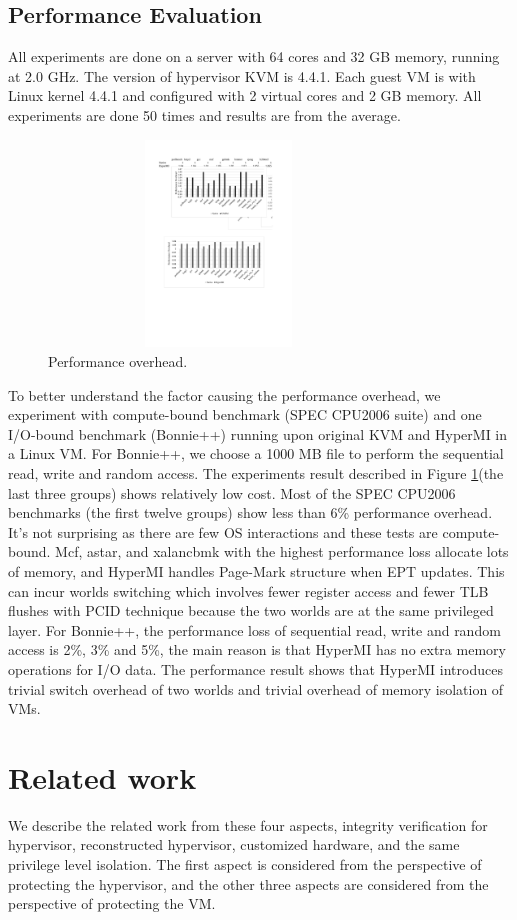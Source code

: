 \documentclass[conference]{IEEEtran}
\begin{document}
\subsection{Performance Evaluation}
All experiments are done on a server with 64 cores and 32 GB memory, running at 2.0 GHz. The version of hypervisor KVM is 4.4.1. Each guest VM is with Linux kernel 4.4.1 and configured with 2 virtual cores and 2 GB memory. All experiments are done 50 times and results are from the average.
\begin{figure}
\centerline{\includegraphics[width=9cm,height=5.5cm]{performance.pdf}}
\caption{Performance overhead.} \label{fig5}
\end{figure}
To better understand the factor causing the performance overhead, we experiment with compute-bound benchmark (SPEC CPU2006 suite) and one I/O-bound benchmark (Bonnie++) running upon original KVM and HyperMI in a Linux VM. For Bonnie++, we choose a 1000 MB file to perform the sequential read, write and random access. The experiments result described in Figure \ref{fig5}(the last three groups) shows relatively low cost. Most of the SPEC CPU2006 benchmarks (the first twelve groups) show less than 6\% performance overhead. It's not surprising as there are few OS interactions and these tests are compute-bound. Mcf, astar, and xalancbmk with the highest performance loss allocate lots of memory, and HyperMI handles Page-Mark structure when EPT updates. This can incur worlds switching which involves fewer register access and fewer TLB flushes with PCID technique because the two worlds are at the same privileged layer. For Bonnie++, the performance loss of sequential read, write and random access is 2\%, 3\% and 5\%, the main reason is that HyperMI has no extra memory operations for I/O data. The performance result shows that HyperMI introduces trivial switch overhead of two worlds and trivial overhead of memory isolation of VMs.
\section{Related work}\label{sec:related}
We describe the related work from these four aspects, integrity verification for hypervisor, reconstructed hypervisor, customized hardware, and the same privilege level isolation. The first aspect is considered from the perspective of protecting the hypervisor, and the other three aspects are considered from the perspective of protecting the VM.
\end{document}
